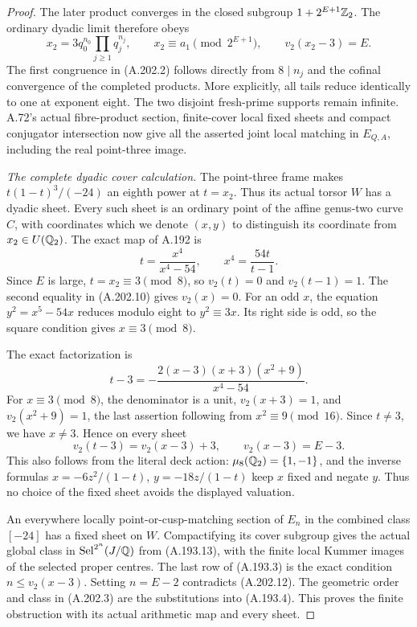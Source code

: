 \begin{proof}
The later product converges in the closed subgroup
\(1+2^{E+1}\mathbb Z_2\).  The ordinary dyadic limit therefore obeys
\[
 x_2=3q_0^{n_0}\prod_{j\geq1}q_j^{n_j},\qquad
 x_2\equiv a_1\pmod {2^{E+1}},\qquad
                       v_2(x_2-3)=E.
\tag{A.202.9}
\]
The first congruence in (A.202.2) follows directly from
\(8\mid n_j\) and the cofinal convergence of the completed
products.  More explicitly, all tails reduce identically to
one at exponent eight.  The two disjoint fresh-prime supports
remain infinite.  A.72's actual fibre-product section,
finite-cover local fixed sheets and compact conjugator
intersection now give all the asserted joint local matching
in \(E_{Q,A}\), including the real point-three image.

\emph{The complete dyadic cover calculation.}
The point-three frame makes
\(t(1-t)^3/(-24)\) an eighth power at \(t=x_2\).
Thus its actual torsor \(W\) has a dyadic sheet.
Every such sheet is an ordinary point of the affine genus-two
curve \(C\), with coordinates which we denote \((x,y)\)
to distinguish its coordinate from \(x_2\in U(\mathbb Q_2)\).
The exact map of A.192 is
\[
 t=\frac{x^4}{x^4-54},\qquad
 x^4=\frac{54t}{t-1}.
\tag{A.202.10}
\]
Since \(E\) is large, \(t=x_2\equiv3\pmod8\), so
\(v_2(t)=0\) and \(v_2(t-1)=1\).  The second equality
in (A.202.10) gives \(v_2(x)=0\).
For an odd \(x\), the equation \(y^2=x^5-54x\) reduces
modulo eight to \(y^2\equiv3x\).  Its right side is odd,
so the square condition gives \(x\equiv3\pmod8\).

The exact factorization is
\[
 t-3=-\frac{2(x-3)(x+3)(x^2+9)}{x^4-54}.
\tag{A.202.11}
\]
For \(x\equiv3\pmod8\), the denominator is a unit,
\(v_2(x+3)=1\), and \(v_2(x^2+9)=1\), the last assertion
following from \(x^2\equiv9\pmod {16}\).
Since \(t\ne3\), we have \(x\ne3\).  Hence on every sheet
\[
              v_2(t-3)=v_2(x-3)+3,
                  \qquad v_2(x-3)=E-3.
\tag{A.202.12}
\]
This also follows from the literal deck action:
\(\mu_8(\mathbb Q_2)=\{1,-1\}\), and the inverse formulas
\(x=-6z^2/(1-t)\), \(y=-18z/(1-t)\) keep \(x\) fixed
and negate \(y\).  Thus no choice of the fixed sheet avoids
the displayed valuation.

An everywhere locally point-or-cusp-matching section of \(E_n\)
in the combined class \([-24]\) has a fixed sheet on \(W\).
Compactifying its cover subgroup gives the actual global
class in \(\operatorname{Sel}^{2^n}(J/\mathbb Q)\) from
(A.193.13), with the finite local Kummer images of the selected
proper centres.  The last row of (A.193.3) is the exact condition
\(n\leq v_2(x-3)\).  Setting \(n=E-2\) contradicts
(A.202.12).  The geometric order and class in (A.202.3)
are the substitutions into (A.193.4).  This proves the finite
obstruction with its actual arithmetic map and every sheet.


\end{proof}
